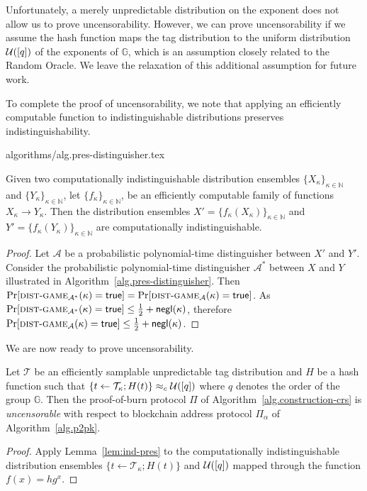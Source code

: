 Unfortunately, a merely unpredictable distribution on the exponent does not allow us to prove uncensorability. However, we can prove uncensorability if we assume the hash function maps the tag distribution to the uniform distribution $\mathcal{U}([q])$ of the exponents of $\mathbb{G}$, which is an assumption closely related to the Random Oracle. We leave the relaxation of this additional assumption for future work.

To complete the proof of uncensorability, we note that applying an efficiently computable function to indistinguishable distributions preserves indistinguishability.

{algorithms/alg.pres-distinguisher.tex}

\begin{lemma}\label{lem:ind-pres}
  Given two
  computationally indistinguishable distribution ensembles
  $\{X_\kappa\}_{\kappa\in\mathbb{N}}$ and $\{Y_\kappa\}_{\kappa\in\mathbb{N}}$,
  let
  $\{f_\kappa\}_{\kappa\in\mathbb{N}}$,
  be an efficiently computable family of functions $X_\kappa \longrightarrow Y_\kappa$.
  Then the distribution ensembles
  $X' = \{f_\kappa(X_\kappa)\}_{\kappa\in\mathbb{N}}$
  and
  $Y' = \{f_\kappa(Y_\kappa)\}_{\kappa\in\mathbb{N}}$
  are computationally indistinguishable.
\end{lemma}
\begin{proof}
  Let $\mathcal{A}$ be a probabilistic polynomial-time distinguisher
  between $X'$ and $Y'$. Consider the probabilistic polynomial-time distinguisher $\mathcal{A}^*$ between $X$ and $Y$ illustrated in Algorithm~\ref{alg.pres-distinguisher}. Then
  $\Pr[\textsc{dist}\-\text{-}\-\textsc{game}_{\mathcal{A}^*}(\kappa) = \mathsf{true}] =
   \Pr[\textsc{dist}\-\text{-}\-\textsc{game}_{\mathcal{A}}(\kappa) = \mathsf{true}]$.
  As $\Pr[\textsc{dist}\-\text{-}\-\textsc{game}_{\mathcal{A}^*}(\kappa) = \mathsf{true}] \leq \frac{1}{2} + \textsf{negl}(\kappa)$, therefore $\Pr[\textsc{dist}\-\text{-}\-\textsc{game}_{\mathcal{A}}(\kappa) = \mathsf{true}] \leq \frac{1}{2} + \textsf{negl}(\kappa)$.
\end{proof}

We are now ready to prove uncensorability.

\begin{theorem}[Uncensorability]
  Let $\mathcal{T}$ be an efficiently samplable unpredictable tag distribution and $H$ be a hash function such that $\{t \gets \mathcal{T}_\kappa; H(t)\} \approx_c \mathcal{U}([q])$ where $q$ denotes the order of the group $\mathbb{G}$. Then the proof-of-burn protocol $\Pi$ of Algorithm~\ref{alg.construction-crs} is \emph{uncensorable} with respect to blockchain address protocol $\Pi_\alpha$ of Algorithm~\ref{alg.p2pk}.
\end{theorem}
\begin{proof}
  Apply Lemma~\ref{lem:ind-pres} to the computationally indistinguishable distribution ensembles $\{t \gets \mathcal{T}_\kappa; H(t)\}$ and $\mathcal{U}([q])$ mapped through the function $f(x) = h g^x$.
\end{proof}

